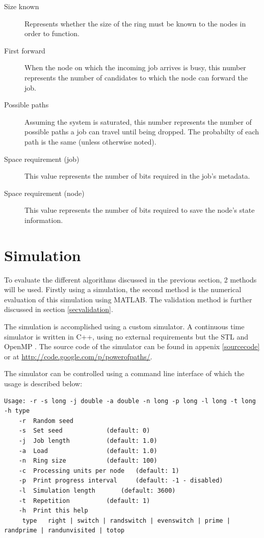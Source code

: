\documentclass[10pt,a4paper]{article}
\begin{document}
\begin{description}
\item[Size known] Represents whether the size of the ring must be known to the nodes in order to function.
\item[First forward] When the node on which the incoming job arrives is busy, this number represents the number of candidates to which the node can forward the job.
\item[Possible paths] Assuming the system is saturated, this number represents the number of possible paths a job can travel until being dropped. The probabilty of each path is the same (unless otherwise noted).
\item[Space requirement (job)] This value represents the number of bits required in the job's metadata.
\item[Space requirement (node)] This value represents the number of bits required to save the node's state information.
\end{description}

\section{Simulation}
\label{secsimulation}
To evaluate the different algorithms discussed in the previous section, 2 methods will be used. Firstly using a simulation, the second method is the numerical evaluation of this simulation using MATLAB. The validation method is further discussed in section \ref{secvalidation}.

The simulation is accomplished using a custom simulator. A continuous time simulator is written in C++, using no external requirements but the STL and OpenMP \cite{OPENMP}. The source code of the simulator can be found in appenix \ref{sourcecode} or at \url{http://code.google.com/p/powerofpaths/}.

The simulator can be controlled using a command line interface of which the usage is described below:
\begin{lstlisting}
Usage: -r -s long -j double -a double -n long -p long -l long -t long -h type
	-r	Random seed
	-s	Set seed			(default: 0)
	-j	Job length			(default: 1.0)
	-a	Load				(default: 1.0)
	-n	Ring size			(default: 100)
	-c	Processing units per node	(default: 1)
	-p	Print progress interval		(default: -1 - disabled)
	-l	Simulation length		(default: 3600)
	-t	Repetition			(default: 1)
	-h	Print this help
	 type	right | switch | randswitch | evenswitch | prime | randprime | randunvisited | totop
\end{lstlisting}
\end{document}
